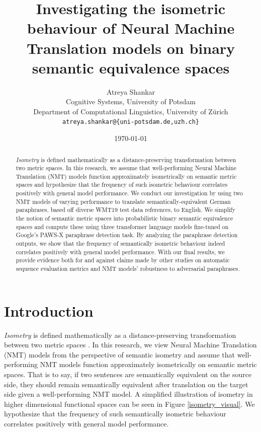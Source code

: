 \documentclass[11pt,a4paper]{article}
\title{Investigating the isometric behaviour of Neural Machine Translation models on binary semantic equivalence spaces}
\author{Atreya Shankar \\
  Cognitive Systems, University of Potsdam \\
  Department of Computational Linguistics, University of Zürich \\
  \texttt{atreya.shankar@\{uni-potsdam.de,uzh.ch\}}}
\date{\today}
\begin{document}
\maketitle

\begin{abstract}
  \textit{Isometry} is defined mathematically as a distance-preserving transformation between two metric spaces. In this research, we assume that well-performing Neural Machine Translation (NMT) models function approximately isometrically on semantic metric spaces and hypothesize that the frequency of such isometric behaviour correlates positively with general model performance. We conduct our investigation by using two NMT models of varying performance to translate semantically-equivalent German paraphrases, based off diverse WMT19 test data references, to English. We simplify the notion of semantic metric spaces into probabilistic binary semantic equivalence spaces and compute these using three transformer language models fine-tuned on Google's PAWS-X paraphrase detection task. By analyzing the paraphrase detection outputs, we show that the frequency of semantically isometric behaviour indeed correlates positively with general model performance. With our final results, we provide evidence both for and against claims made by other studies on automatic sequence evaluation metrics and NMT models' robustness to adversarial paraphrases.
\end{abstract}

\section{Introduction}

\textit{Isometry} is defined mathematically as a distance-preserving transformation between two metric spaces \cite{coxeter1961introduction}. In this research, we view Neural Machine Translation (NMT) models from the perspective of semantic isometry and assume that well-performing NMT models function approximately isometrically on semantic metric spaces. That is to say, if two sentences are semantically equivalent on the source side, they should remain semantically equivalent after translation on the target side given a well-performing NMT model. A simplified illustration of isometry in higher dimensional functional spaces can be seen in Figure \ref{isometry_visual}. We hypothesize that the frequency of such semantically isometric behaviour correlates positively with general model performance. 
\end{document}
